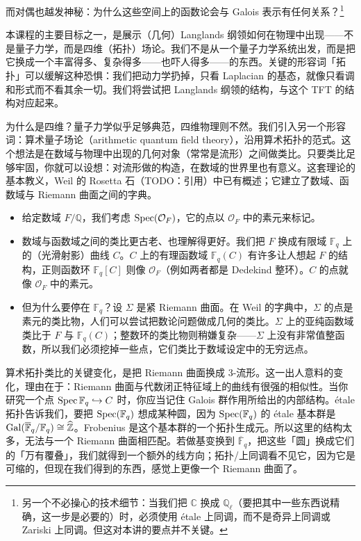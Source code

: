 
而对偶也越发神秘：为什么这些空间上的函数论会与 Galois 表示有任何关系？\footnote{另一个不必操心的技术细节：当我们把 $\mathbb{C}$ 换成 $\mathbb{Q}_\ell$（要把其中一些东西说精确，这一步是必要的）时，必须使用 étale 上同调，而不是奇异上同调或 Zariski 上同调。但这对本讲的要点并不关键。}

本课程的主要目标之一，是展示（几何）Langlands 纲领如何在物理中出现——不是量子力学，而是四维（拓扑）场论。我们不是从一个量子力学系统出发，而是把它换成一个丰富得多、复杂得多——也吓人得多——的东西。关键的形容词「拓扑」可以缓解这种恐惧：我们把动力学扔掉，只看 Laplacian 的基态，就像只看调和形式而不看其余一切。我们将尝试把 Langlands 纲领的结构，与这个 TFT 的结构对应起来。

为什么是四维？量子力学似乎足够典范，四维物理则不然。我们引入另一个形容词：算术量子场论（arithmetic quantum field theory），沿用算术拓扑的范式。这个想法是在数域与物理中出现的几何对象（常常是流形）之间做类比。只要类比足够牢固，你就可以设想：对流形做的构造，在数域的世界里也有意义。这套理论的基本教义，Weil 的 Rosetta 石（TODO：引用）中已有概述；它建立了数域、函数域与 Riemann 曲面之间的字典。

\begin{itemize}
  \item 给定数域 $F/\mathbb{Q}$，我们考虑 $\operatorname{Spec}(\mathcal{O}_F)$，它的点以 $\mathcal{O}_F$ 中的素元来标记。
  \item 数域与函数域之间的类比更古老、也理解得更好。我们把 $F$ 换成有限域 $\mathbb{F}_q$ 上的（光滑射影）曲线 $C$。$C$ 上的有理函数域 $\mathbb{F}_q(C)$ 有许多让人想起 $F$ 的结构，正则函数环 $\mathbb{F}_q[C]$ 则像 $\mathcal{O}_F$（例如两者都是 Dedekind 整环）。$C$ 的点就像 $\mathcal{O}_F$ 中的素元。
  \item 但为什么要停在 $\mathbb{F}_q$？设 $\Sigma$ 是紧 Riemann 曲面。在 Weil 的字典中，$\Sigma$ 的点是素元的类比物，人们可以尝试把数论问题做成几何的类比。$\Sigma$ 上的亚纯函数域类比于 $F$ 与 $\mathbb{F}_q(C)$；整数环的类比物则稍嫌复杂——$\Sigma$ 上没有非常值整函数，所以我们必须挖掉一些点，它们类比于数域设定中的无穷远点。
\end{itemize}

算术拓扑类比的关键变化，是把 Riemann 曲面换成 3-流形。这一出人意料的变化，理由在于：Riemann 曲面与代数闭正特征域上的曲线有很强的相似性。当你研究一个点 $\operatorname{Spec} \mathbb{F}_q\hookrightarrow C$ 时，你应当记住 Galois 群作用所给出的内部结构。étale 拓扑告诉我们，要把 $\operatorname{Spec}(\mathbb{F}_q)$ 想成某种圆，因为 $\operatorname{Spec}(\mathbb{F}_q)$ 的 étale 基本群是 $\operatorname{Gal}(\overline{\mathbb{F}}_q/\mathbb{F}_q)\cong\widehat{\mathbb{Z}}$。Frobenius 是这个基本群的一个拓扑生成元。所以这里的结构太多，无法与一个 Riemann 曲面相匹配。若做基变换到 $\overline{\mathbb{F}}_q$，把这些「圆」换成它们的「万有覆叠」，我们就得到一个额外的线方向；拓扑/上同调看不见它，因为它是可缩的，但现在我们得到的东西，感觉上更像一个 Riemann 曲面了。

